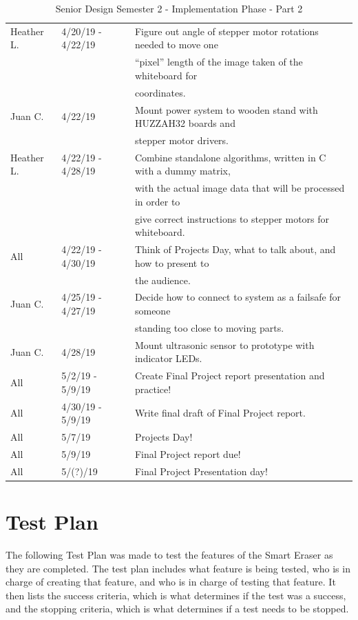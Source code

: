 \begin{table} [H]
\begin{tabular}{|l|l|l|}
		\hline
		Heather L. & 4/20/19 - 4/22/19 	& Figure out angle of stepper motor rotations needed to move one \\
					&					& ``pixel'' length of the image taken of the whiteboard for \\
					&					& coordinates. \\
				\hline
		Juan C. & 4/22/19 				& Mount power system to wooden stand with HUZZAH32 boards and \\
					&					& stepper motor drivers. \\
		\hline
		Heather L. & 4/22/19 - 4/28/19 	& Combine standalone algorithms, written in C with a dummy matrix, \\
				&						& with the actual image data that will be processed in order to \\
				&						& give correct instructions to stepper motors for whiteboard. \\
		\hline
		All & 4/22/19 - 4/30/19 		& Think of Projects Day, what to talk about, and how to present to \\
				&						& the audience. \\
		\hline
		Juan C. & 4/25/19 - 4/27/19 	& Decide how to connect to system as a failsafe for someone \\
					&					& standing too close to moving parts. \\
		\hline
		Juan C. & 4/28/19 				& Mount ultrasonic sensor to prototype with indicator LEDs. \\
		\hline
		All & 5/2/19 - 5/9/19 			& Create Final Project report presentation and practice! \\
		\hline
		All & 4/30/19 - 5/9/19 			& Write final draft of Final Project report. \\
		\hline
		All & 5/7/19 					& Projects Day! \\
		\hline
		All & 5/9/19 					& Final Project report due! \\
		\hline
		All & 5/(?)/19 					& Final Project Presentation day! \\
		\hline
	\end{tabular} 
	\caption{Senior Design Semester 2 - Implementation Phase - Part 2}
	\label{table:5}
\end{table}

\section{Test Plan}

The following Test Plan was made to test the features of the Smart Eraser as they are completed. The test plan includes what feature is being tested, who is in charge of creating that feature, and who is in charge of testing that feature. It then lists the success criteria, which is what determines if the test was a success, and the stopping criteria, which is what determines if a test needs to be stopped.

